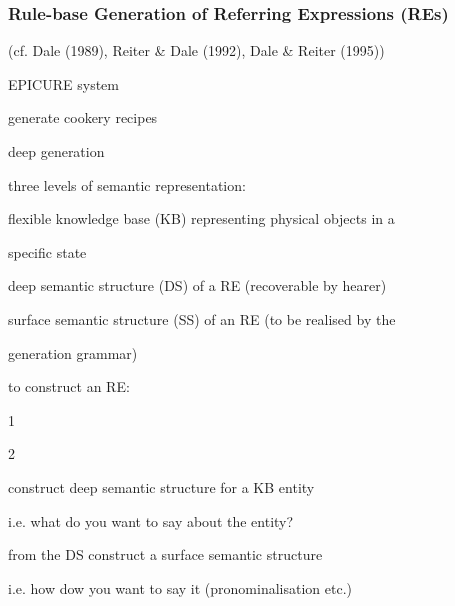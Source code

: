 \documentclass[compress,color=usenames]{beamer}
\begin{document}
\begin{frame}
\frametitle{
Rule-base Generation of Referring Expressions (REs)}



(cf. Dale (1989), Reiter \& Dale (1992), Dale \& Reiter (1995))






EPICURE system



generate cookery recipes



deep generation



three levels of semantic representation:



ﬂexible knowledge base (KB) representing physical objects in a



speciﬁc state



deep semantic structure (DS) of a RE (recoverable by hearer)



surface semantic structure (SS) of an RE (to be realised by the



generation grammar)






to construct an RE:


1





2


construct deep semantic structure for a KB entity



i.e. what do you want to say about the entity?



from the DS construct a surface semantic structure



i.e. how dow you want to say it (pronominalisation etc.)











\end{frame}
\end{document}
